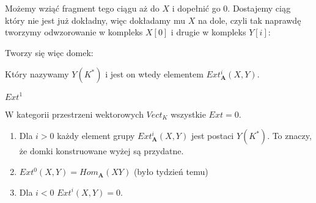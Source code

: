 Możemy wziąć fragment tego ciągu aż do $X$ i dopełnić go $0$. Dostajemy ciąg który nie jest już dokładny, więc dokładamy mu $X$ na dole, czyli tak naprawdę tworzymy odwzorowanie w kompleks $X[0]$ i drugie w kompleks $Y[i]$:
\begin{center}\end{center}
Tworzy się więc domek:
\begin{center}\end{center}
Który nazywamy $Y(K^*)$ i jest on wtedy elementem $Ext_{\mathbf{A}}^i(X, Y)$.

\begin{example}
  \item $Ext^1$
    \begin{center}\end{center}
  \item W kategorii przestrzeni wektorowych $Vect_K$ wszystkie $Ext=0$.
\end{example}

\begin{theorem}
  \begin{enumerate}[label=(\alph*)]
    \item Dla $i>0$ każdy element grupy $Ext_{\mathbf{A}}^i(X, Y)$ jest postaci $Y(K^*)$. To znaczy, że domki konstruowane wyżej są przydatne.
    \item $Ext^0(X, Y)=Hom_{\mathbf{A}}(X Y)$ (było tydzień temu)
    \item Dla $i<0$ $Ext^i(X, Y)=0$.
  \end{enumerate}
\end{theorem}

